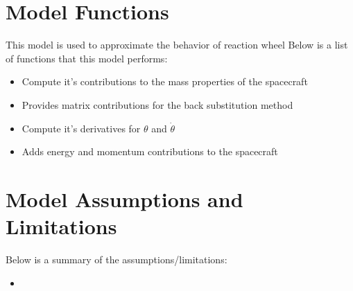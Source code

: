 \section{Model Functions}

This model is used to approximate the behavior of reaction wheel Below is a list of functions that this model performs:

\begin{itemize}
	\item Compute it's contributions to the mass properties of the spacecraft
	\item Provides matrix contributions for the back substitution method
	\item Compute it's derivatives for $\theta$ and $\dot{\theta}$
	\item Adds energy and momentum contributions to the spacecraft
\end{itemize}

\section{Model Assumptions and Limitations}
Below is a summary of the assumptions/limitations:

\begin{itemize}
	\item 
\end{itemize}